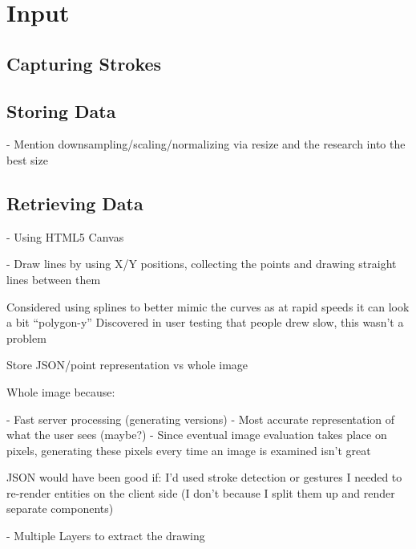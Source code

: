 \section{Input}

\subsection{Capturing Strokes}

\subsection{Storing Data}

- Mention downsampling/scaling/normalizing via resize and the research into the best size

\subsection{Retrieving Data}

- Using HTML5 Canvas

- Draw lines by using X/Y positions, collecting the points and drawing straight lines between them

Considered using splines to better mimic the curves as at rapid speeds it can look a bit ``polygon-y''
Discovered in user testing that people drew slow, this wasn't a problem

Store JSON/point representation vs whole image

Whole image because:

- Fast server processing (generating versions)
- Most accurate representation of what the user sees (maybe?)
- Since eventual image evaluation takes place on pixels, generating these pixels every time an image is examined isn't great

JSON would have been good if:
I'd used stroke detection or gestures
I needed to re-render entities on the client side (I don't because I split them up and render separate components)

- Multiple Layers to extract the drawing
